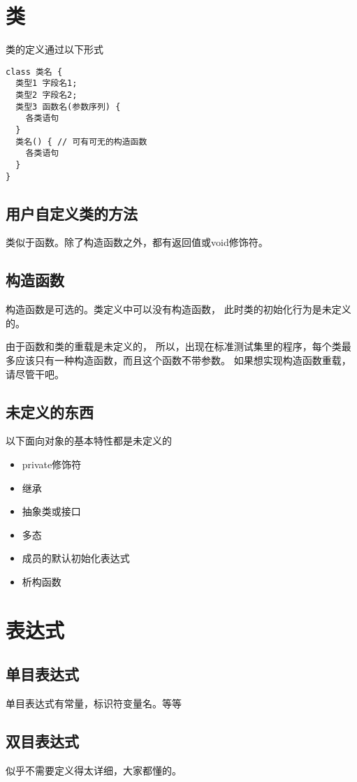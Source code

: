 \documentclass[twocolumn]{article}
\begin{document}
\section{类}
类的定义通过以下形式
\begin{verbatim}
class 类名 {
  类型1 字段名1;
  类型2 字段名2;
  类型3 函数名(参数序列) {
    各类语句  
  }
  类名() { // 可有可无的构造函数
    各类语句  
  }
}
\end{verbatim}

\subsection{用户自定义类的方法}
类似于函数。除了构造函数之外，都有返回值或void修饰符。

\subsection{构造函数}
构造函数是可选的。类定义中可以没有构造函数，
此时类的初始化行为是未定义的。

由于函数和类的重载是未定义的，
所以，出现在标准测试集里的程序，每个类最多应该只有一种构造函数，而且这个函数不带参数。
如果想实现构造函数重载，请尽管干吧。

\subsection{未定义的东西}
以下面向对象的基本特性都是未定义的
\begin{itemize}
\item private修饰符
\item 继承
\item 抽象类或接口
\item 多态
\item 成员的默认初始化表达式
\item 析构函数
\end{itemize}

\section{表达式}
\subsection{单目表达式}
单目表达式有常量，标识符变量名。等等
\subsection{双目表达式}
似乎不需要定义得太详细，大家都懂的。
\end{document}
